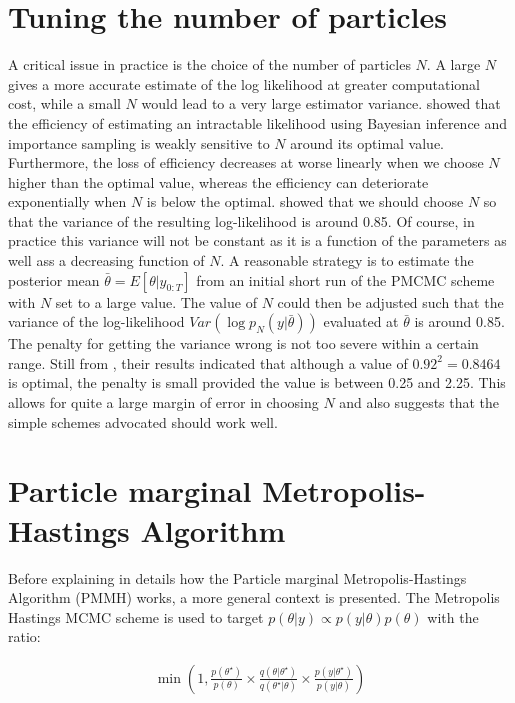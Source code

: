 \documentclass[11pt,a4,twosided,singlespacing,titlepagenumber=on]{scrreprt}
\numberwithin{equation}{chapter} %
\theoremstyle{remark}
\begin{document}
\section{Tuning the number of particles}
\label{sec:tuning_n}
A critical issue in practice is the choice of the number of particles $N$. A large $N$ gives a more accurate estimate of the log likelihood at greater computational cost, while a small $N$ would lead to a very large estimator variance. \cite{tran2014} showed that the efficiency of estimating an intractable likelihood using Bayesian inference and importance sampling is weakly sensitive to $N$ around its optimal value. Furthermore, the loss of efficiency decreases at worse linearly when we choose $N$ higher than the optimal value, whereas
the efficiency can deteriorate exponentially when $N$ is below the optimal. \cite{pitt2012} showed that we should choose $N$ so that the variance of the resulting log-likelihood is around 0.85. Of course, in practice this variance will not be constant as it is a function of the parameters as well ass a decreasing function of $N$. A reasonable strategy is to estimate the posterior mean $\bar{\theta} = E[\theta|y_{0:T}]$ from an initial short run of the PMCMC scheme with $N$ set to a large value. The value of $N$ could then be adjusted such that the variance
of the log-likelihood $Var(\log p_N(y|\bar{\theta}))$ evaluated at $\bar{\theta}$ is around 0.85. The penalty for getting the variance wrong is not too severe within a certain range. Still from \cite{pitt2012}, their results indicated that although a value of $0.92^2 = 0.8464$ is optimal, the penalty is small provided the value is between 0.25 and 2.25. This allows for quite a large margin of error in choosing $N$ and also suggests that the simple schemes advocated should work well.

\section{Particle marginal Metropolis-Hastings Algorithm}

Before explaining in details how the Particle marginal Metropolis-Hastings Algorithm (PMMH) works, a more general context is presented. The Metropolis Hastings MCMC scheme is used to target $p(\theta| y) \propto p(y|\theta)p(\theta)$ with the ratio:

\begin{align*}
\min \left( 1, \frac{p(\theta^\star)}{p(\theta)} \times  \frac{q(\theta|\theta^\star)}{q(\theta^\star|\theta)} \times \frac{p({y}|\theta^\star)}{p({y}|\theta)} \right)
\end{align*}
\end{document}
